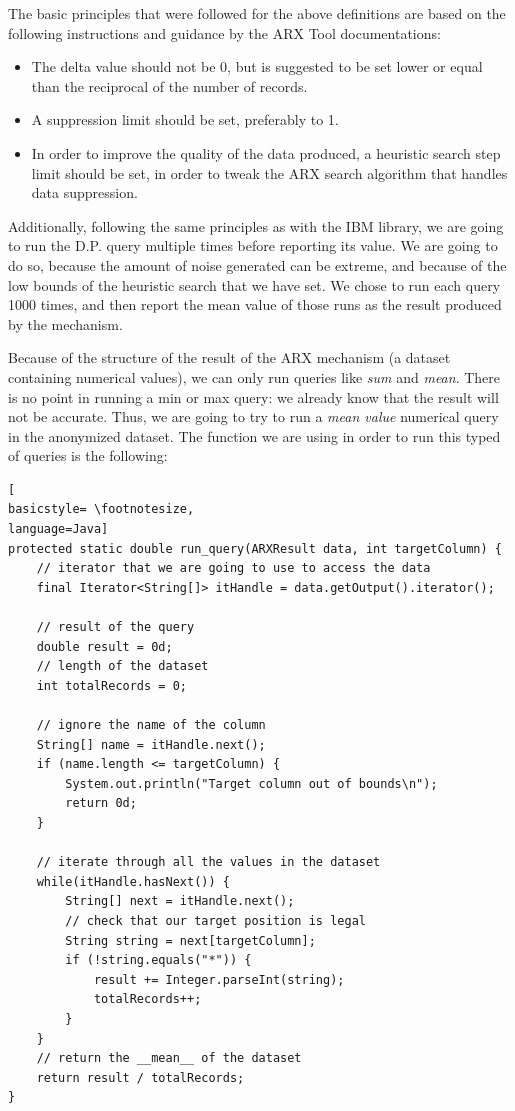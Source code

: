 The basic principles that were followed for the above definitions are based on the following instructions and guidance by the ARX Tool documentations:
\begin{itemize}
    \item The delta value should not be 0, but is suggested to be set lower or equal than the reciprocal of the number of records.
    \item A suppression limit should be set, preferably to 1.
    \item In order to improve the quality of the data produced, a heuristic search step limit should be set, in order to tweak the ARX search algorithm that handles data suppression.
\end{itemize}

Additionally, following the same principles as with the IBM library, we are going to run the D.P. query multiple times before reporting its value. We are going to do so, because the amount of noise generated can be extreme, and because of the low bounds of the heuristic search that we have set. We chose to run each query 1000 times, and then report the mean value of those runs as the result produced by the mechanism.

Because of the structure of the result of the ARX mechanism (a dataset containing numerical values), we can only run queries like \emph{sum} and \emph{mean}. There is no point in running a min or max query: we already know that the result will not be accurate. Thus, we are going to try to run a\emph{ mean value} numerical query in the anonymized dataset. The function we are using in order to run this typed of queries is the following:
\bigskip
\clearpage
\begin{lstlisting}[
basicstyle= \footnotesize,
language=Java]
protected static double run_query(ARXResult data, int targetColumn) {
	// iterator that we are going to use to access the data
	final Iterator<String[]> itHandle = data.getOutput().iterator();
	
	// result of the query
	double result = 0d;
	// length of the dataset
	int totalRecords = 0;
	
	// ignore the name of the column
	String[] name = itHandle.next();
	if (name.length <= targetColumn) {
		System.out.println("Target column out of bounds\n");
		return 0d;
	}

	// iterate through all the values in the dataset
	while(itHandle.hasNext()) {
		String[] next = itHandle.next();
		// check that our target position is legal
		String string = next[targetColumn];
		if (!string.equals("*")) {
			result += Integer.parseInt(string);		
			totalRecords++;				
		}
	}
    // return the __mean__ of the dataset
    return result / totalRecords;
}
	
\end{lstlisting}
\bigskip

